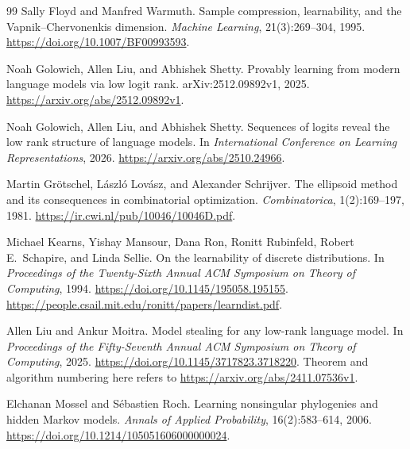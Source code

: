 \documentclass[11pt]{article}
\theoremstyle{definition}
\theoremstyle{remark}
\begin{document}
\begin{thebibliography}{99}
Sally Floyd and Manfred Warmuth.
\newblock Sample compression, learnability, and the Vapnik--Chervonenkis dimension.
\newblock \emph{Machine Learning}, 21(3):269--304, 1995.
\newblock \url{https://doi.org/10.1007/BF00993593}.

Noah Golowich, Allen Liu, and Abhishek Shetty.
\newblock Provably learning from modern language models via low logit rank.
\newblock arXiv:2512.09892v1, 2025.
\newblock \url{https://arxiv.org/abs/2512.09892v1}.

Noah Golowich, Allen Liu, and Abhishek Shetty.
\newblock Sequences of logits reveal the low rank structure of language models.
\newblock In \emph{International Conference on Learning Representations}, 2026.
\newblock \url{https://arxiv.org/abs/2510.24966}.

Martin Gr{\"o}tschel, L{\'a}szl{\'o} Lov{\'a}sz, and Alexander Schrijver.
\newblock The ellipsoid method and its consequences in combinatorial optimization.
\newblock \emph{Combinatorica}, 1(2):169--197, 1981.
\newblock \url{https://ir.cwi.nl/pub/10046/10046D.pdf}.

Michael Kearns, Yishay Mansour, Dana Ron, Ronitt Rubinfeld, Robert E.~Schapire, and Linda Sellie.
\newblock On the learnability of discrete distributions.
\newblock In \emph{Proceedings of the Twenty-Sixth Annual ACM Symposium on Theory of Computing}, 1994.
\newblock \url{https://doi.org/10.1145/195058.195155}.
\newblock \url{https://people.csail.mit.edu/ronitt/papers/learndist.pdf}.

Allen Liu and Ankur Moitra.
\newblock Model stealing for any low-rank language model.
\newblock In \emph{Proceedings of the Fifty-Seventh Annual ACM Symposium on Theory of Computing}, 2025.
\newblock \url{https://doi.org/10.1145/3717823.3718220}.
\newblock Theorem and algorithm numbering here refers to
\url{https://arxiv.org/abs/2411.07536v1}.

Elchanan Mossel and S{\'e}bastien Roch.
\newblock Learning nonsingular phylogenies and hidden Markov models.
\newblock \emph{Annals of Applied Probability}, 16(2):583--614, 2006.
\newblock \url{https://doi.org/10.1214/105051606000000024}.


\end{thebibliography}
\end{document}
